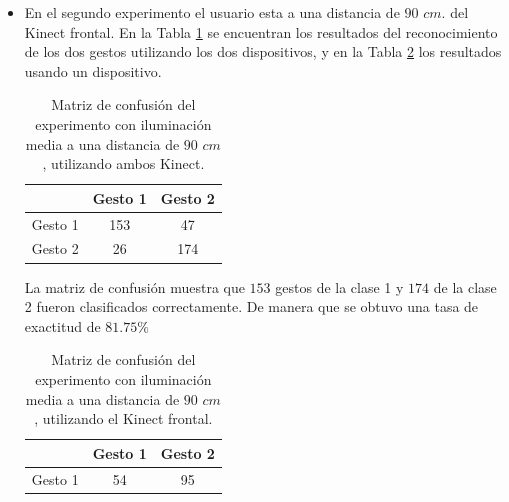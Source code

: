 \begin{itemize}
La matriz de confusión muestra que $136$ gestos de la clase 1 y $193$ de la clase 2 fueron clasificados correctamente. De manera que se obtuvo una tasa de exactitud de $82.25 \%$  

En este caso se observa una mejor exactitud cuando se utiliza solo un Kinect. 


\item En el segundo experimento el usuario esta a una distancia de $90$ $cm.$ del Kinect frontal. En la Tabla \ref{table:90LMK2} se encuentran los resultados del reconocimiento de los dos gestos utilizando los dos dispositivos, y en la Tabla \ref{table:90LMK1} los resultados usando un dispositivo.     


\begin{table}[h!] 
\begin{center}
\begin{tabular}{ r || c | c |}  
        & Gesto 1 & Gesto 2 \\ \hline \hline  
Gesto 1 & 153     &  47     \\ \hline  
Gesto 2 & 26      & 174     \\   
\end{tabular}
\end{center} 
\caption{Matriz de confusión del experimento con iluminación media a una distancia de $90$ $cm$, utilizando ambos Kinect.} 
\label{table:90LMK2}
\end{table}

La matriz de confusión muestra que $153$ gestos de la clase 1 y $174$ de la clase 2 fueron clasificados correctamente. De manera que se obtuvo una tasa de exactitud de $81.75 \%$ 

\begin{table}[h!] 
\begin{center}
\begin{tabular}{ r || c | c |} 
        & Gesto 1 & Gesto 2 \\ \hline \hline  
Gesto 1 &  54    &   95    \\ \hline  
\end{tabular}
\end{center} 
\caption{Matriz de confusión del experimento con iluminación media a una distancia de $90$ $cm$, utilizando el Kinect frontal.} 
\label{table:90LMK1} 
\end{table}  


\end{itemize}
